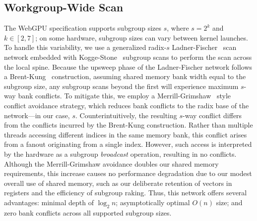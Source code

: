 \documentclass[acmsmall, manuscript, screen, review, anonymous]{acmart}
\begin{document}
\subsection{Workgroup-Wide Scan}
The WebGPU specification supports subgroup sizes $s$, where $s = 2^k$ and $k \in [2, 7]$; on some hardware, subgroup sizes can vary between kernel launches. To handle this variability, we use a generalized radix-$s$ Ladner-Fischer~\cite{10.1145/322217.322232} scan network embedded with Kogge-Stone~\cite{5009159} subgroup scans to perform the scan across the local spine. Because the upsweep phase of the Ladner-Fischer network follows a Brent-Kung~\cite{1675982} construction, assuming shared memory bank width equal to the subgroup size, any subgroup scans beyond the first will experience maximum $s$-way bank conflicts. To mitigate this, we employ a Merrill-Grimshaw~\cite[Section 3.3.5]{Merrill2009} style conflict avoidance strategy, which reduces bank conflicts to the radix base of the network—in our case, $s$. Counterintuitively, the resulting $s$-way conflict differs from the conflicts incurred by the Brent-Kung construction. Rather than multiple threads accessing different indices in the same memory bank, this conflict arises from a fanout originating from a single index. However, such access is interpreted by the hardware as a subgroup \emph{broadcast} operation, resulting in no conflicts. Although the Merrill-Grimshaw avoidance doubles our shared memory requirements, this increase causes no performance degradation due to our modest overall use of shared memory, such as our deliberate retention of vectors in registers and the efficiency of subgroup raking. Thus, this network offers several advantages: minimal depth of $\log_2 n$; asymptotically optimal $O(n)$ size; and zero bank conflicts across all supported subgroup sizes.
\end{document}
